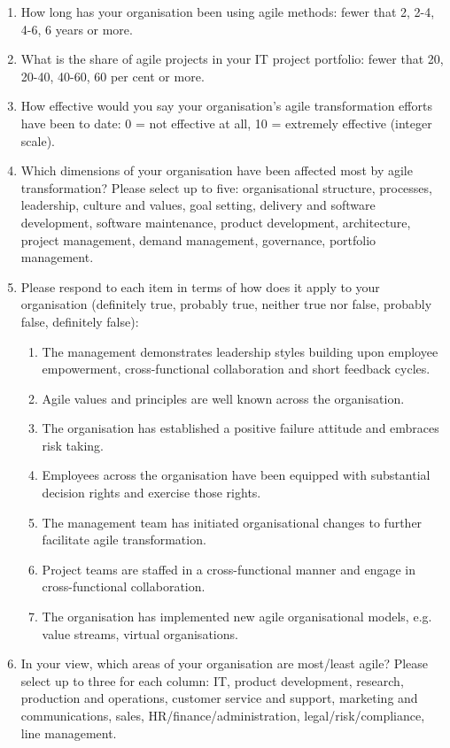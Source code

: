 \documentclass{article}
\begin{document}
\begin{enumerate}
    \item How long has your organisation been using agile methods: fewer that 2, 2-4, 4-6, 6 years or more.
    \item What is the share of agile projects in your IT project portfolio: fewer that 20, 20-40, 40-60, 60 per cent or more.
    \item How effective would you say your organisation's agile transformation efforts have been to date: 0 = not effective at all, 10 = extremely effective (integer scale).
    \item Which dimensions of your organisation have been affected most by agile transformation? Please select up to five: organisational structure, processes, leadership, culture and values, goal setting, delivery and software development, software maintenance, product development, architecture, project management, demand management, governance, portfolio management.
    \item Please respond to each item in terms of how does it apply to your organisation (definitely true, probably true, neither true nor false, probably false, definitely false):
    \begin{enumerate}
        \item The management demonstrates leadership styles building upon employee empowerment, cross-functional collaboration and short feedback cycles.
        \item Agile values and principles are well known across the organisation.
        \item The organisation has established a positive failure attitude and embraces risk taking.
        \item Employees across the organisation have been equipped with substantial decision rights and exercise those rights.
        \item The management team has initiated organisational changes to further facilitate agile transformation.
        \item Project teams are staffed in a cross-functional manner and engage in cross-functional collaboration.
        \item The organisation has implemented new agile organisational models, e.g. value streams, virtual organisations.
    \end{enumerate}
    \item In your view, which areas of your organisation are most/least agile? Please select up to three for each column: IT, product development, research, production and operations, customer service and support, marketing and communications, sales, HR/finance/administration, legal/risk/compliance, line management.

\end{enumerate}
\end{document}

